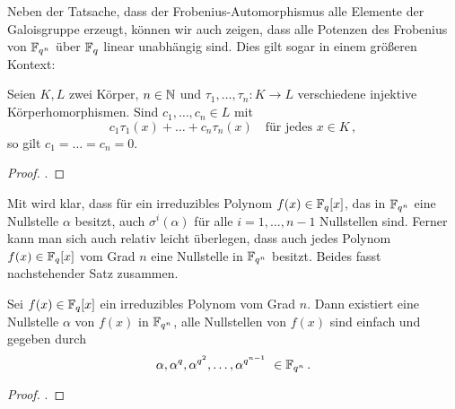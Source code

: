 Neben der Tatsache, dass der Frobenius-Automorphismus 
alle Elemente der Galoisgruppe erzeugt, können wir
auch zeigen, dass alle Potenzen des Frobenius von $\mathbb{F}_{q^n}$ über $\mathbb{F}_q$ linear
unabhängig sind. Dies gilt sogar in einem größeren Kontext:

\begin{satz}
  \label{satz:dedekindsches_lemma}
  Seien $K,L$ zwei Körper, $n \in \mathbb{N}$ und $\tau_1,\ldots,\tau_n: K\to L$
  verschiedene injektive Körperhomorphismen. 
  Sind $c_1,\ldots,c_n \in L$ mit
  \[ c_1\tau_1(x)+ \ldots+ c_n\tau_n(x)
    \quad\text{für jedes $x\in K$}\,,\]
  so gilt $c_1=\ldots=c_n=0$.
\end{satz}
\begin{proof}
  \autocite[Satz 27.2]{karpfinger2010algebra}.
\end{proof}


Mit  wird klar, dass für ein
irreduzibles Polynom $f(x) \in \mathbb{F}_q[x]$, das in $\mathbb{F}_{q^n}$ eine Nullstelle 
$\alpha$ besitzt, auch $\sigma^i(\alpha)$ für alle $i=1,\ldots,n-1$
Nullstellen sind. Ferner kann man sich auch relativ leicht überlegen, dass auch
jedes Polynom $f(x) \in \mathbb{F}_q[x]$ vom Grad $n$ eine Nullstelle in 
$\mathbb{F}_{q^n}$ besitzt. Beides fasst nachstehender Satz zusammen.

\begin{satz}
  \label{satz:nst_irred_polys}
  Sei $f(x) \in \mathbb{F}_q[x]$ ein irreduzibles Polynom vom Grad $n$. Dann 
  existiert eine Nullstelle $\alpha$ von $f(x)$ in $\mathbb{F}_{q^n}$, alle 
  Nullstellen von $f(x)$ sind einfach und gegeben durch
  \[ \alpha, \alpha^q, \alpha^{q^2}, \ldots, \alpha^{q^{n-1}}\ \in \mathbb{F}_{q^n}\,.\]
\end{satz}
\begin{proof}
  \autocite[Theorem 2.14]{lidl1997finite}.
\end{proof}

